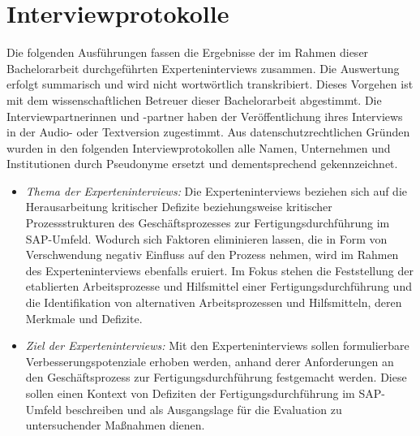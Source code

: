 \chapter{Interviewprotokolle}

Die folgenden Ausführungen fassen die Ergebnisse der im Rahmen dieser Bachelorarbeit durchgeführten Experteninterviews zusammen.
Die Auswertung erfolgt summarisch und wird nicht wortwörtlich transkribiert.
Dieses Vorgehen ist mit dem wissenschaftlichen Betreuer dieser Bachelorarbeit abgestimmt.
Die Interviewpartnerinnen und -partner haben der Veröffentlichung ihres Interviews in der Audio- oder Textversion zugestimmt.
Aus datenschutzrechtlichen Gründen wurden in den folgenden Interviewprotokollen alle Namen, Unternehmen und Institutionen durch Pseudonyme ersetzt und dementsprechend gekennzeichnet.

\begin{itemize}
  \item
        \textit{Thema der Experteninterviews:} 
        Die Experteninterviews beziehen sich auf die Herausarbeitung kritischer Defizite beziehungsweise kritischer Prozessstrukturen des Geschäftsprozesses zur Fertigungsdurchführung im SAP-Umfeld.
        Wodurch sich Faktoren eliminieren lassen, die in Form von Verschwendung negativ Einfluss auf den Prozess nehmen, wird im Rahmen des Experteninterviews ebenfalls eruiert. 
        Im Fokus stehen die Feststellung der etablierten Arbeitsprozesse und Hilfsmittel einer Fertigungsdurchführung und die Identifikation von alternativen Arbeitsprozessen und Hilfsmitteln, deren Merkmale und Defizite.
  \item 
        \textit{Ziel der Experteninterviews:}
        Mit den Experteninterviews sollen formulierbare Verbesserungspotenziale erhoben werden, anhand derer Anforderungen an den Geschäftsprozess zur Fertigungsdurchführung festgemacht werden.
        Diese sollen einen Kontext von Defiziten der Fertigungsdurchführung im SAP-Umfeld beschreiben und als Ausgangslage für die Evaluation zu untersuchender Maßnahmen dienen.
\end{itemize}

\newpage

\newpage

\newpage
